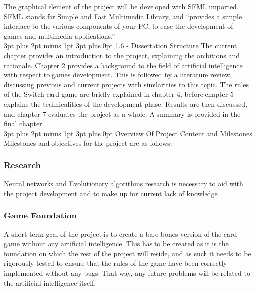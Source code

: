 \documentclass[12pt,a4paper]{article}
\makeatletter
\renewcommand\subsection{\@startsection {subsection}{1}{2mm} %
                               {3pt plus 2pt minus 1pt} %
                               {3pt plus 0pt} %
                               {\normalfont\bfseries}}
\makeatother
\begin{document}

The graphical element of the project will be developed with SFML imported. SFML stands for Simple and Fast Multimedia Library, and \enquote{provides a simple interface to the various components of your PC, to ease the development of games and multimedia applications\citep{SFML}.}\\


\subsection{1.6 - Dissertation Structure}
The current chapter provides an introduction to the project, explaining the ambitions and rationale. Chapter 2 provides a background to the field of artificial intelligence with respect to games development. This is followed by a literature review, discussing previous and current projects with similarities to this topic. The rules of the Switch card game are briefly explained in chapter 4, before chapter 5 explains the technicalities of the development phase. Results are then discussed, and chapter 7 evaluates the project as a whole. A summary is provided in the final chapter. \\

 \subsection{Overview Of Project Content and Milestones}
Milestones and objectives for the project are as follows: 
\subsubsection{Research}
Neural networks and Evolutionary algorithms research is necessary to aid with the project development and to make up for current lack of knowledge

\subsubsection{Game Foundation}
A short-term goal of the project is to create a bare-bones version of the card game without any artificial intelligence. This has to be created as it is the foundation on which the rest of the project will reside, and as such it needs to be rigorously tested to ensure that the rules of the game have been correctly implemented without any bugs. That way, any future problems will be related to the artificial intelligence itself.
\end{document}
